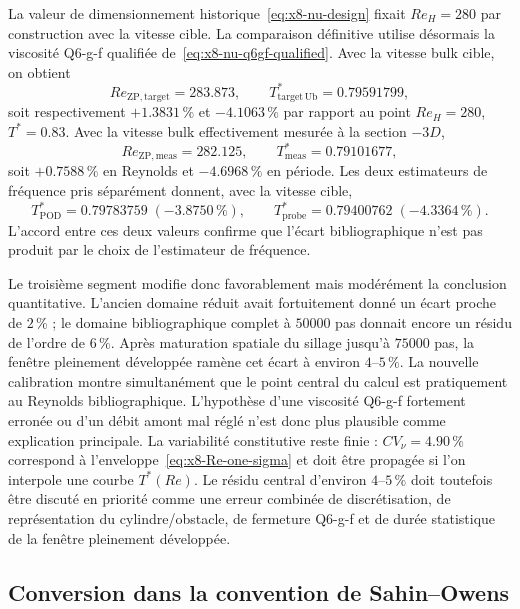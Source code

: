 \documentclass[11pt,a4paper]{article}
\begin{document}
La valeur de dimensionnement historique~\eqref{eq:x8-nu-design} fixait $Re_H=280$ par construction avec la vitesse cible. La comparaison définitive utilise désormais la viscosité Q6-g-f qualifiée de~\eqref{eq:x8-nu-q6gf-qualified}. Avec la vitesse bulk cible, on obtient
\begin{equation}
 Re_{\mathrm{ZP,target}}=283.873,
 \qquad
 T^*_{\mathrm{target\,Ub}}=0.79591799,
\end{equation}
soit respectivement $+1.3831\,\%$ et $-4.1063\,\%$ par rapport au point $Re_H=280$, $T^*=0.83$. Avec la vitesse bulk effectivement mesurée à la section $-3D$,
\begin{equation}
 \boxed{Re_{\mathrm{ZP,meas}}=282.125,}
 \qquad
 \boxed{T^*_{\mathrm{meas}}=0.79101677,}
\end{equation}
soit $+0.7588\,\%$ en Reynolds et $-4.6968\,\%$ en période. Les deux estimateurs de fréquence pris séparément donnent, avec la vitesse cible,
\begin{equation}
 T^*_{\mathrm{POD}}=0.79783759\;(-3.8750\,\%),
 \qquad
 T^*_{\mathrm{probe}}=0.79400762\;(-4.3364\,\%).
\end{equation}
L'accord entre ces deux valeurs confirme que l'écart bibliographique n'est pas produit par le choix de l'estimateur de fréquence.

Le troisième segment modifie donc favorablement mais modérément la conclusion quantitative. L'ancien domaine réduit avait fortuitement donné un écart proche de $2\,\%$ ; le domaine bibliographique complet à $50000$ pas donnait encore un résidu de l'ordre de $6\,\%$. Après maturation spatiale du sillage jusqu'à $75000$ pas, la fenêtre pleinement développée ramène cet écart à environ $4$--$5\,\%$. La nouvelle calibration montre simultanément que le point central du calcul est pratiquement au Reynolds bibliographique. L'hypothèse d'une viscosité Q6-g-f fortement erronée ou d'un débit amont mal réglé n'est donc plus plausible comme explication principale. La variabilité constitutive reste finie : $CV_\nu=4.90\,\%$ correspond à l'enveloppe~\eqref{eq:x8-Re-one-sigma} et doit être propagée si l'on interpole une courbe $T^*(Re)$. Le résidu central d'environ $4$--$5\,\%$ doit toutefois être discuté en priorité comme une erreur combinée de discrétisation, de représentation du cylindre/obstacle, de fermeture Q6-g-f et de durée statistique de la fenêtre pleinement développée.

\subsection{Conversion dans la convention de Sahin--Owens}
\end{document}
